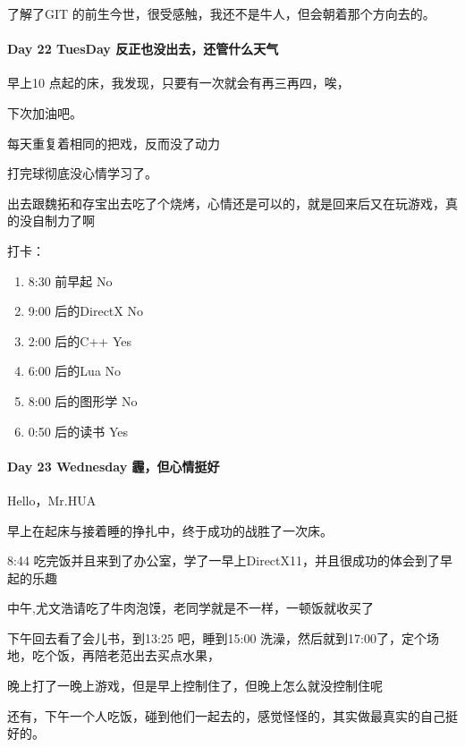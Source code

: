 \documentclass[UTF8,a4paper,8pt]{ctexart}
\begin{document}
       了解了GIT 的前生今世，很受感触，我还不是牛人，但会朝着那个方向去的。
       
       \paragraph{Day 22 TuesDay  \quad  反正也没出去，还管什么天气}
       
       早上10 点起的床，我发现，只要有一次就会有再三再四，唉，
       
       下次加油吧。
       
       每天重复着相同的把戏，反而没了动力
       
       打完球彻底没心情学习了。
       
       出去跟魏拓和存宝出去吃了个烧烤，心情还是可以的，就是回来后又在玩游戏，真的没自制力了啊
       
       打卡：
       \begin{enumerate}[fullwidth,itemindent=2em,label=(\arabic*)]
       	\item  8:30 前早起 \quad  No
       	\item  9:00 后的DirectX \quad No
       	\item  2:00 后的C++ \quad Yes
       	\item  6:00 后的Lua  \quad No
       	\item  8:00 后的图形学 \quad No
       	\item  0:50 后的读书 \quad Yes
       \end{enumerate}
       
      \paragraph{Day 23 Wednesday  \quad  霾，但心情挺好}
        Hello，Mr.HUA
        
        早上在起床与接着睡的挣扎中，终于成功的战胜了一次床。
        
        8:44 吃完饭并且来到了办公室，学了一早上DirectX11，并且很成功的体会到了早起的乐趣
        
        中午,尤文浩请吃了牛肉泡馍，老同学就是不一样，一顿饭就收买了
        
        下午回去看了会儿书，到13:25 吧，睡到15:00 洗澡，然后就到17:00了，定个场地，吃个饭，再陪老范出去买点水果，
        
        晚上打了一晚上游戏，但是早上控制住了，但晚上怎么就没控制住呢
        
        还有，下午一个人吃饭，碰到他们一起去的，感觉怪怪的，其实做最真实的自己挺好的。
        
\end{document}
